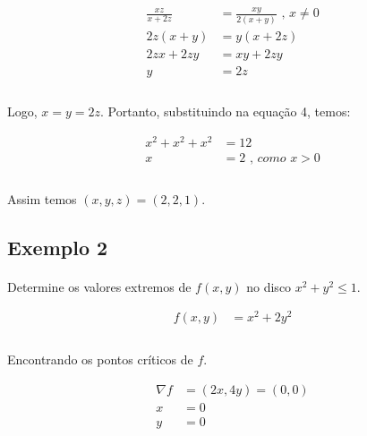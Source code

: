 \documentclass{article}
\begin{document}
            \begin{align*}
                \frac{xz}{x + 2z} &= \frac{xy} {2 (x + y)} \textit{ , }x \neq 0\\
                2z(x + y) &= y(x + 2z)\\
                2zx + 2zy &= xy + 2zy\\
                y &= 2z\\
            \end{align*}

            \paragraph{}
            Logo, $x = y = 2z$. Portanto, substituindo na equação 4, temos:

            \begin{align*}
                x^2 + x^2 + x^2 &= 12\\
                x &= 2 \textit{ , como }x > 0\\
            \end{align*}

            \paragraph{}
            Assim temos $(x, y, z) = (2, 2, 1)$.

        \subsection{Exemplo 2}
            \paragraph{}
            Determine os valores extremos de $f(x, y)$ no disco $x^2 + y^2 \leq 1$.

            \begin{align*}
                f(x, y) &= x^2 + 2y^2\\
            \end{align*}

            \paragraph{}
            Encontrando os pontos críticos de $f$.

            \begin{align*}
                \nabla f &= (2x, 4y) = (0, 0)\\
                x &= 0\\
                y &= 0\\
            \end{align*}
\end{document}
